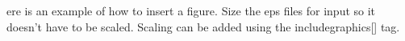 \documentclass[10pt,hyperref,normalmargins]{ucdthesis}
\begin{document}
 ere is an example of how to insert a figure. Size the eps files for input so it doesn't have to be scaled. Scaling can be added using the includegraphics[] tag. 
\begin{figure}[h]
    \begin{centering}
\end{centering}
\end{figure}
\end{document}
